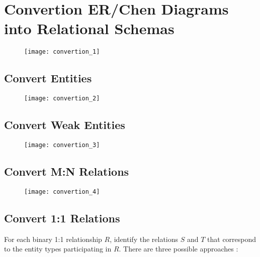 \section{Convertion ER/Chen Diagrams into Relational Schemas}

\begin{figure}[H]
    \centering
    \texttt{[image: convertion\_1]}
\end{figure}

\subsection{Convert Entities}


\begin{figure}[H]
    \centering
    \texttt{[image: convertion\_2]}
\end{figure}

\subsection{Convert Weak Entities}


\begin{figure}[H]
    \centering
    \texttt{[image: convertion\_3]}
\end{figure}

\subsection{Convert M:N Relations}


\begin{figure}[H]
    \centering
    \texttt{[image: convertion\_4]}
\end{figure}

\subsection{Convert 1:1 Relations}

For each binary 1:1 relationship $R$, identify the relations $S$ and $T$ that correspond to the entity types participating in $R$. There are three possible approaches :

